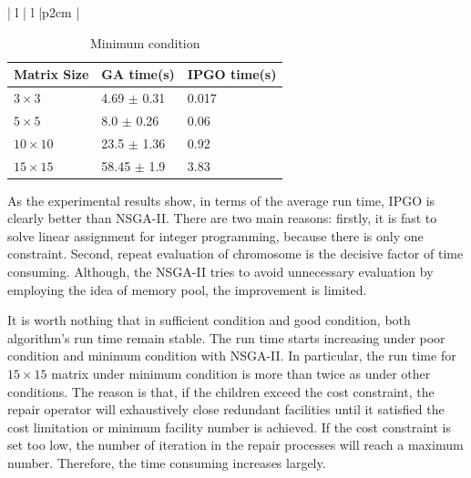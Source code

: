 \documentclass{llncs}
\begin{document}
\begin{table}[!htb]
\begin{minipage}{.5\linewidth}
\begin{tabular}{ | l | l |p{2cm} |}
	\end{tabular}
	\end{minipage}
	\label{table:poor}
\begin{minipage}{.5\linewidth}
	\caption{Minimum condition}
	\begin{tabular}{ | l | l |p{2cm} |}
		\hline
		Matrix Size & GA time(s) & IPGO time(s)\\ \hline
		$3 \times 3$  & 4.69 $\pm$ 0.31 & 0.017\\ \hline
		$5 \times 5$  & 8.0 $\pm$ 0.26 & 0.06 \\ \hline
		$10 \times 10$ &23.5 $\pm$ 1.36 & 0.92\\ \hline
		$15 \times 15$  & 58.45 $\pm$ 1.9 & 3.83\\ \hline
	\end{tabular}
	\end{minipage}
	\label{table:minimum}
\end{table}

As the experimental results show, in terms of the average run time, IPGO is clearly better than NSGA-II. 
There are two main reasons: firstly, it is fast to solve linear assignment for integer programming, because there 
is only one constraint. Second, repeat evaluation of chromosome is the decisive factor of time consuming. 
Although, the NSGA-II tries to avoid unnecessary evaluation by employing the idea of memory pool, 
the improvement is limited. 

It is worth nothing that in sufficient condition and good condition, both algorithm's run time remain stable. The run time starts
increasing under poor condition and minimum condition with NSGA-II. In particular, the run time for $15 \times 15$ matrix under 
minimum condition is more than twice as under other conditions.  The reason is that, if the children exceed the cost constraint, 
the repair operator will exhaustively close redundant facilities until it satisfied the cost limitation or minimum facility 
number is achieved. If the cost constraint is set too low, the number of iteration in the repair 
processes will reach a maximum number. Therefore, the time consuming increases largely.
\end{document}
